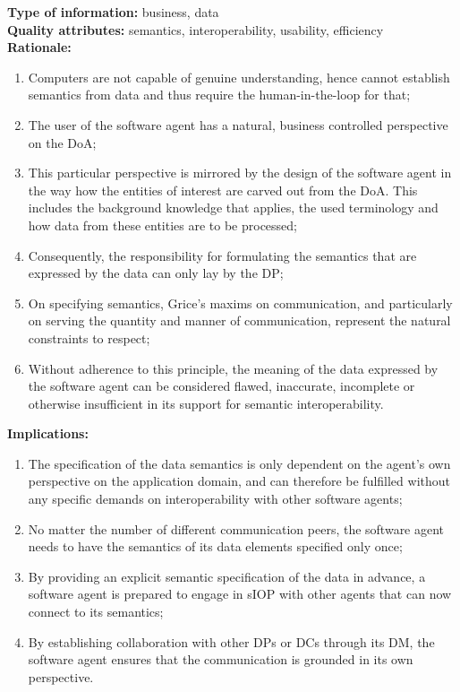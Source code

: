 \documentclass[sort&compress,preprint,authoryear,3p,twocolumn]{elsarticle}
\begin{document}
\begin{mmdp}
\textbf{Type of information:} business, data  \\
\textbf{Quality attributes:} semantics, interoperability, usability, efficiency   \\
\textbf{Rationale:}
\begin{enumerate}
  \item Computers are not capable of genuine understanding, hence cannot establish semantics from data and thus require the human-in-the-loop for that;
  \item The user of the software agent has a natural, business controlled perspective on the DoA;
  \item This particular perspective is mirrored by the design of the software agent in the way how the entities of interest are carved out from the DoA. This includes the background knowledge that applies, the used terminology and how data from these entities are to be processed;
  \item Consequently, the responsibility for formulating the semantics that are expressed by the data can only lay by the DP;
  \item On specifying semantics, Grice's maxims on communication, and particularly on serving the quantity and manner of communication, represent the natural constraints to respect;
  \item Without adherence to this principle, the meaning of the data expressed by the software agent can be considered flawed, inaccurate, incomplete or otherwise insufficient in its support for semantic interoperability.
\end{enumerate}
\textbf{Implications:}
\begin{enumerate}
  \item The specification of the data semantics is only dependent on the agent's own perspective on the application domain, and can therefore be fulfilled without any specific demands on interoperability with other software agents;
  \item No matter the number of different communication peers, the software agent needs to have the semantics of its data elements specified only once;
  \item By providing an explicit semantic specification of the data in advance, a software agent is prepared to engage in sIOP with other agents that can now connect to its semantics;
  \item By establishing collaboration with other DPs or DCs through its DM, the software agent ensures that the communication is grounded in its own perspective.
\end{enumerate}  
\end{mmdp}
\end{document}
